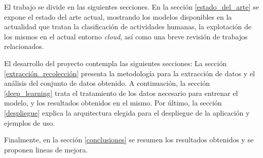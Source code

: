 El trabajo se divide en las siguientes secciones. En la sección \ref{estado_del_arte} se expone el estado del arte actual, mostrando los modelos disponibles en la actualidad que tratan la clasificación de actividades humanas, la explotación de los mismos en el actual entorno \textit{cloud}, así como una breve revisión de trabajos relacionados.

El desarrollo del proyecto contempla las siguientes secciones: La sección \ref{extracción_recolección} presenta la metodología para la extracción de datos y el análisis del conjunto de datos obtenido. A continuación, la sección \ref{deep_learning} trata el tratamiento de los datos necesario para entrenar el modelo, y los resultados obtenidos en el mismo. Por último, la sección \ref{despliegue} explica la arquitectura elegida para el despliegue de la aplicación y ejemplos de uso.

Finalmente, en la sección \ref{conclusiones} se resumen los resultados obtenidos y se proponen lineas de mejora.
